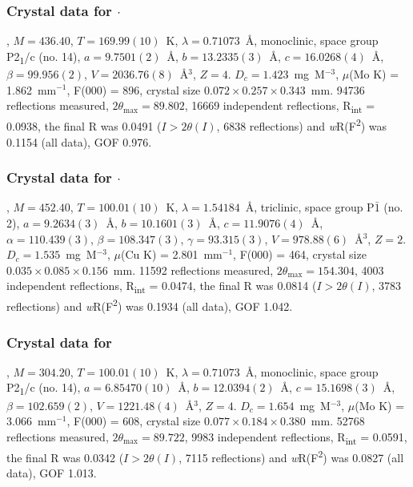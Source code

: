 \begin{refsection}
\subsubsection{Crystal data for \texorpdfstring{$\cdot$}{C23 H23 N3 O Se}}
, $M=436.40$, $T=169.99(10)$~K, $\lambda=0.71073$~\AA, monoclinic, space group P2\textsubscript{1}/c (no. 14), $a = 9.7501(2)$~\AA, $b = 13.2335(3)$~\AA, $c = 16.0268(4)$~\AA, $\beta = 99.956(2)$\degree, $V = 2036.76(8)$~\AA$^{3}$, $Z = 4$. $D_{c}= 1.423$~mg~M$^{-3}$, $\mu$(Mo K\a) = 1.862~mm$^{-1}$, F(000) = 896, crystal size $0.072 \times 0.257 \times 0.343$~mm. 94736 reflections measured, $2\theta_{\mathrm{max}}=89.802$\degree, 16669 independent reflections, R\textsubscript{int} = 0.0938, the final R was 0.0491 ($I > 2\theta(I)$, 6838 reflections) and \emph{w}R(F\textsuperscript{2}) was 0.1154 (all data), GOF 0.976.

\subsubsection{Crystal data for \texorpdfstring{$\cdot$}{C23 H23 N3 O2 Se}}
, $M=452.40$, $T=100.01(10)$~K, $\lambda=1.54184$~\AA, triclinic, space group P$\bar{1}$ (no. 2), $a = 9.2634(3)$~\AA, $b = 10.1601(3)$~\AA, $c = 11.9076(4)$~\AA, $\alpha = 110.439(3)$\degree, $\beta = 108.347(3)$\degree, $\gamma = 93.315(3)$\degree, $V = 978.88(6)$~\AA$^{3}$, $Z = 2$. $D_{c}= 1.535$~mg~M$^{-3}$, $\mu$(Cu K\a) = 2.801~mm$^{-1}$, F(000) = 464, crystal size $0.035 \times 0.085 \times 0.156$~mm. 11592 reflections measured, $2\theta_{\mathrm{max}}=154.304$\degree, 4003 independent reflections, R\textsubscript{int} = 0.0474, the final R was 0.0814 ($I > 2\theta(I)$, 3783 reflections) and \emph{w}R(F\textsuperscript{2}) was 0.1934 (all data), GOF 1.042.

\subsubsection{Crystal data for \texorpdfstring{}{C14 H11 N O2 Se}}
, $M=304.20$, $T=100.01(10)$~K, $\lambda=0.71073$~\AA, monoclinic, space group P2\textsubscript{1}/c (no. 14), $a = 6.85470(10)$~\AA, $b = 12.0394(2)$~\AA, $c = 15.1698(3)$~\AA, $\beta = 102.659(2)$\degree, $V = 1221.48(4)$~\AA$^{3}$, $Z = 4$. $D_{c}= 1.654$~mg~M$^{-3}$, $\mu$(Mo K\a) = 3.066~mm$^{-1}$, F(000) = 608, crystal size $0.077 \times 0.184 \times 0.380$~mm. 52768 reflections measured, $2\theta_{\mathrm{max}}=89.722$\degree, 9983 independent reflections, R\textsubscript{int} = 0.0591, the final R was 0.0342 ($I > 2\theta(I)$, 7115 reflections) and \emph{w}R(F\textsuperscript{2}) was 0.0827 (all data), GOF 1.013.


\end{refsection}
